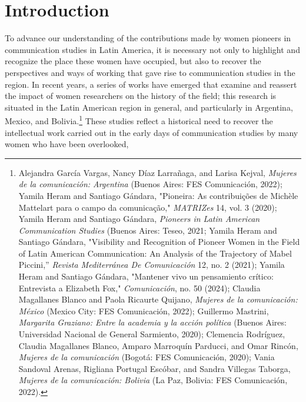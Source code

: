\documentclass{tufte-handout}
\begin{document}



\hypertarget{introduction}{%
\section{Introduction}\label{introduction}}

To advance our understanding of the contributions made by women pioneers
in communication studies in Latin America, it is necessary not only to
highlight and recognize the place these women have occupied, but also to
recover the perspectives and ways of working that gave rise to
communication studies in the region. In recent years, a series of works
have emerged that examine and reassert the impact of women researchers
on the history of the field; this research is situated in the Latin
American region in general, and particularly in Argentina, Mexico, and
Bolivia.\footnote{Alejandra García Vargas, Nancy Díaz Larrañaga, and
  Larisa Kejval, \emph{Mujeres de la comunicación: Argentina} (Buenos
  Aires: FES Comunicación, 2022); Yamila Heram and Santiago Gándara,
  "Pioneira: As contribuições de Michèle Mattelart para o campo da
  comunicação," \emph{MATRIZes} 14, vol. 3 (2020); Yamila Heram and
  Santiago Gándara, \emph{Pioneers in Latin American Communication
  Studies} (Buenos Aires: Teseo, 2021; Yamila Heram and Santiago
  Gándara, "Visibility and Recognition of Pioneer Women in the Field of
  Latin American Communication: An Analysis of the Trajectory of Mabel
  Piccini,'' \emph{Revista Mediterránea De Comunicación} 12, no. 2
  (2021); Yamila Heram and Santiago Gándara, "Mantener vivo un
  pensamiento crítico: Entrevista a Elizabeth Fox," \emph{Comunicación},
  no. 50 (2024); Claudia Magallanes Blanco and Paola Ricaurte Quijano,
  \emph{Mujeres de la comunicación: México} (Mexico City: FES
  Comunicación, 2022); Guillermo Mastrini, \emph{Margarita Graziano:
  Entre la academia y la acción política} (Buenos Aires: Universidad
  Nacional de General Sarmiento, 2020); Clemencia Rodríguez, Claudia
  Magallanes Blanco, Amparo Marroquín Parducci, and Omar Rincón,
  \emph{Mujeres de la comunicación} (Bogotá: FES Comunicación, 2020);
  Vania Sandoval Arenas, Rigliana Portugal Escóbar, and Sandra Villegas
  Taborga, \emph{Mujeres de la comunicación: Bolivia} (La Paz, Bolivia:
  FES Comunicación, 2022).} These studies reflect a historical need to
recover the intellectual work carried out in the early days of
communication studies by many women who have been overlooked,
\end{document}
